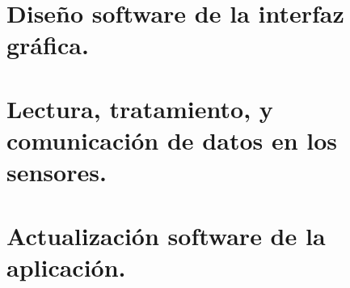 \section{Diseño software de la interfaz gráfica.}



\section{Lectura, tratamiento, y comunicación de datos en los sensores.}



\section{Actualización software de la aplicación.}




